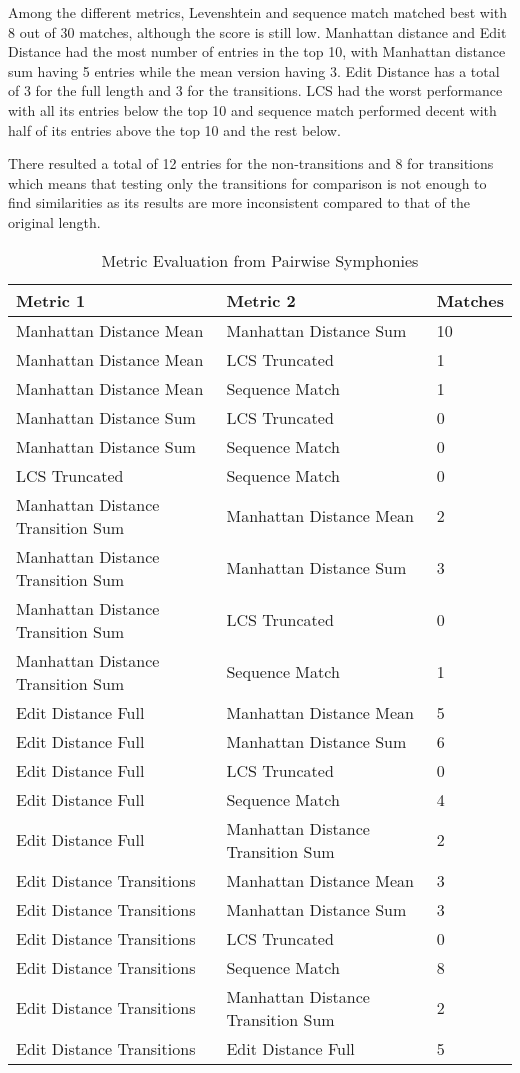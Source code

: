 Among the different metrics, Levenshtein and sequence match matched best with 8 out of 30 matches, although the score is still low. Manhattan distance and Edit Distance had the most number of entries in the top 10, with Manhattan distance sum having 5 entries while the mean version having 3. Edit Distance has a total of 3 for the full length and 3 for the transitions. LCS had the worst performance with all its entries below the top 10 and sequence match performed decent with half of its entries above the top 10 and the rest below.

There resulted a total of 12 entries for the non-transitions and 8 for transitions which means that testing only the transitions for comparison is not enough to find similarities as its results are more inconsistent compared to that of the original length.

\begin{longtable}[c]{|l|l|l|}
\caption{Metric Evaluation from Pairwise Symphonies}
\label{my-label}\\
\hline
Metric 1 & Metric 2 & Matches \\ \hline
\endfirsthead
%
\endhead
%
Manhattan Distance Mean & Manhattan Distance Sum & 10 \\ \hline
Manhattan Distance Mean & LCS Truncated & 1 \\ \hline
Manhattan Distance Mean & Sequence Match & 1 \\ \hline
Manhattan Distance Sum & LCS Truncated & 0 \\ \hline
Manhattan Distance Sum & Sequence Match & 0 \\ \hline
LCS Truncated & Sequence Match & 0 \\ \hline
Manhattan Distance Transition Sum & Manhattan Distance Mean & 2 \\ \hline
Manhattan Distance Transition Sum & Manhattan Distance Sum & 3 \\ \hline
Manhattan Distance Transition Sum & LCS Truncated & 0 \\ \hline
Manhattan Distance Transition Sum & Sequence Match & 1 \\ \hline
Edit Distance Full & Manhattan Distance Mean & 5 \\ \hline
Edit Distance Full & Manhattan Distance Sum & 6 \\ \hline
Edit Distance Full & LCS Truncated & 0 \\ \hline
Edit Distance Full & Sequence Match & 4 \\ \hline
Edit Distance Full & Manhattan Distance Transition Sum & 2 \\ \hline
Edit Distance Transitions & Manhattan Distance Mean & 3 \\ \hline
Edit Distance Transitions & Manhattan Distance Sum & 3 \\ \hline
Edit Distance Transitions & LCS Truncated & 0 \\ \hline
Edit Distance Transitions & Sequence Match & 8 \\ \hline
Edit Distance Transitions & Manhattan Distance Transition Sum & 2 \\ \hline
Edit Distance Transitions & Edit Distance Full & 5 \\ \hline
\end{longtable}

